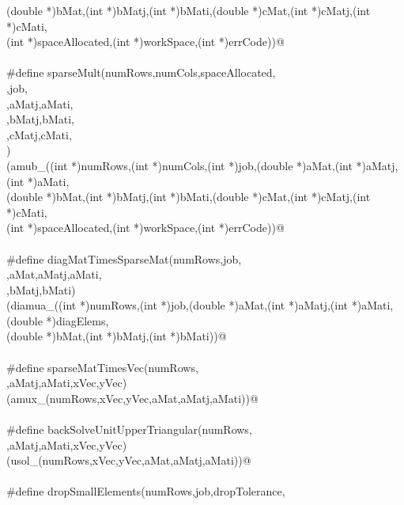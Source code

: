 \documentclass[12pt]{article}
\begin{document}
\begin{flushleft}
\begin{minipage}{\linewidth}
\begin{list}{}{}
\mbox{}\verb@(double *)bMat,(int *)bMatj,(int *)bMati,(double *)cMat,(int *)cMatj,(int *)cMati, \@\\
\mbox{}\verb@(int *)spaceAllocated,(int *)workSpace,(int *)errCode))@\\
\mbox{}\verb@@\\
\mbox{}\verb@#define sparseMult(numRows,numCols,spaceAllocated, \@\\
\mbox{}\verb@workSpace,job, \@\\
\mbox{}\verb@aMat,aMatj,aMati, \@\\
\mbox{}\verb@bMat,bMatj,bMati, \@\\
\mbox{}\verb@cMat,cMatj,cMati, \@\\
\mbox{}\verb@errCode) \@\\
\mbox{}\verb@(amub_((int *)numRows,(int *)numCols,(int *)job,(double *)aMat,(int *)aMatj,(int *)aMati, \@\\
\mbox{}\verb@(double *)bMat,(int *)bMatj,(int *)bMati,(double *)cMat,(int *)cMatj,(int *)cMati, \@\\
\mbox{}\verb@(int *)spaceAllocated,(int *)workSpace,(int *)errCode))@\\
\mbox{}\verb@@\\
\mbox{}\verb@#define diagMatTimesSparseMat(numRows,job, \@\\
\mbox{}\verb@diagElems,aMat,aMatj,aMati, \@\\
\mbox{}\verb@bMat,bMatj,bMati) \@\\
\mbox{}\verb@(diamua_((int *)numRows,(int *)job,(double *)aMat,(int *)aMatj,(int *)aMati,(double *)diagElems, \@\\
\mbox{}\verb@(double *)bMat,(int *)bMatj,(int *)bMati))@\\
\mbox{}\verb@@\\
\mbox{}\verb@#define sparseMatTimesVec(numRows, \@\\
\mbox{}\verb@aMat,aMatj,aMati,xVec,yVec) \@\\
\mbox{}\verb@(amux_(numRows,xVec,yVec,aMat,aMatj,aMati))@\\
\mbox{}\verb@@\\
\mbox{}\verb@#define backSolveUnitUpperTriangular(numRows, \@\\
\mbox{}\verb@aMat,aMatj,aMati,xVec,yVec) \@\\
\mbox{}\verb@(usol_(numRows,xVec,yVec,aMat,aMatj,aMati))@\\
\mbox{}\verb@@\\
\mbox{}\verb@#define dropSmallElements(numRows,job,dropTolerance, \@\\

\end{list}
\end{minipage}
\end{flushleft}
\end{document}

